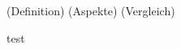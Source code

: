 \documentclass[oneside]{HSMW-Thesis}
\begin{document}
\begin{Referat}
\end{Referat}
\Hauptteil

(Definition)
(Aspekte)
(Vergleich)

test \cite{mauchle2012business}



\end{document}
